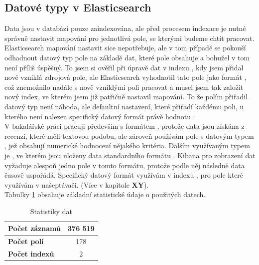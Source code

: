 \documentclass[czech,BP]{thesiskiv}
\begin{document}
\subsection{Datové typy v Elasticsearch}
Data jsou v databázi pouze zaindexována, ale před procesem indexace je nutné správně nastavit mapování pro jednotlivá pole, se kterými budeme chtít pracovat. Elasticsearch mapování nastavit sice nepotřebuje, ale v tom případě se pokouší odhadnout datový typ pole na základě dat, které pole obsahuje a bohužel v tom není příliš úspěšný. To jsem si ověřil při úpravě dat v indexu , kdy jsem přidal nově vzniklá zdrojová pole, ale Elasticsearch vyhodnotil tato pole jako formát , což znemožnilo nadále s nově vzniklými poli pracovat a musel jsem tak založit nový index, ve kterém jsem již patřičně nastavil mapování. To že polím přiřadil datový typ  není náhoda, ale defaultní nastavení, které přiřadí každému poli, u kterého není nalezen specifický datový formát právě hodnotu .
\\
V bakalářské práci pracuji především s formátem , protože data jsou získána z recenzí, které měli textovou podobu, ale zároveň používám pole s datovým typem , jež obsahují numerické hodnocení nějakého kritéria. Dalším využívaným typem je , ve kterém jsou uloženy data standardního formátu . Kibana pro zobrazení dat vyžaduje alespoň jedno pole v tomto formátu, protože podle něj následně data časově uspořádá. Specifický datový formát  využívám v indexu , pro pole které využívám v našeptávači. (Více v kapitole \textbf{XY}).
\\
Tabulky \ref{statistiky} obsahuje základní statistické údaje o použitých datech.

\begin{table}[h]
\centering
\begin{tabular}{|l|c|}
	\hline
	\textbf{Počet záznamů} & 376 519 \\ \hline
	\textbf{Počet polí}    & 178     \\ \hline
	\textbf{Počet indexů}  & 2       \\ \hline
\end{tabular}
\caption{Statistiky dat}
\label{statistiky}
\end{table}
\end{document}
